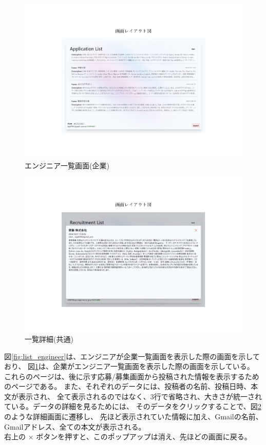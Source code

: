 \documentclass[10pt]{ltjsarticle}
\begin{document}
\begin{figure}[H]
    \centering
    \includegraphics[trim=5.2cm 3.4cm 5.2cm 4.6cm, clip, width=14cm]{./img/List_pages_company.pdf}
    \caption{エンジニア一覧画面(企業)}
    \label{fig:list_company}
\end{figure}
\vspace{-.5cm}

\begin{figure}[H]
    \centering
    \includegraphics[trim=5.2cm 3.4cm 5.2cm 4.6cm, clip, width=14cm]{./img/List_pages_engineer_detail.pdf}
    \caption{一覧詳細(共通)}
    \label{fig:list_engineer_details}
\end{figure}
\vspace{-.5cm}

図\ref{fig:list_engineer}は、エンジニアが企業一覧画面を表示した際の画面を示しており、
図\ref{fig:list_company}は、企業がエンジニア一覧画面を表示した際の画面を示している。\\
\indent これらのページは、後に示す応募/募集画面から投稿された情報を表示するためのページである。
また、それぞれのデータには、投稿者の名前、投稿日時、本文が表示され、
全て表示されるのではなく、3行で省略され、大きさが統一されている。データの詳細を見るためには、
そのデータをクリックすることで、図\ref{fig:list_engineer_details}のような詳細画面に遷移し、
先ほど表示されていた情報に加え、Gmailの名前、Gmailアドレス、全ての本文が表示される。\\
右上の $\times$ ボタンを押すと、このポップアップは消え、先ほどの画面に戻る。
\end{document}
